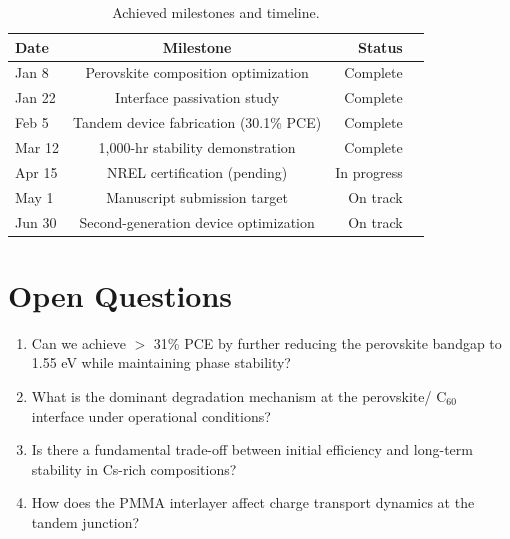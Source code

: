 \documentclass[
    language=english,
    doctype=research-notebook,
    institution=none,
]{../../omnilatex}
\begin{document}
\begin{table}[htbp]
    \centering
    \caption{Achieved milestones and timeline.}
    \label{tab:milestones}
    \begin{tabular}{@{}lcd{10}l@{}}
        \toprule
        Date & Milestone & {Status} \\
        \midrule
        Jan 8  & Perovskite composition optimization    & Complete \\
        Jan 22 & Interface passivation study             & Complete \\
        Feb 5  & Tandem device fabrication (30.1\% PCE) & Complete \\
        Mar 12 & 1,000-hr stability demonstration       & Complete \\
        Apr 15 & NREL certification (pending)            & In progress \\
        May 1  & Manuscript submission target            & On track  \\
        Jun 30 & Second-generation device optimization   & On track  \\
        \bottomrule
    \end{tabular}
\end{table}

\section{Open Questions}
\label{sec:open-questions}

\begin{enumerate}
    \item Can we achieve $>$ 31\% PCE by further reducing the perovskite
          bandgap to 1.55 eV while maintaining phase stability?
    \item What is the dominant degradation mechanism at the perovskite/
          C$_{60}$ interface under operational conditions?
    \item Is there a fundamental trade-off between initial efficiency
          and long-term stability in Cs-rich compositions?
    \item How does the PMMA interlayer affect charge transport dynamics
          at the tandem junction?
\end{enumerate}



\end{document}
